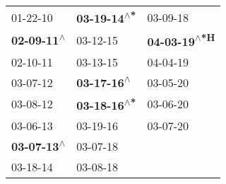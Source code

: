 \begin{supertabular}{lll}
                  01-22-10\textsuperscript{} &  \textbf{03-19-14\textsuperscript{$\wedge$*}} &                     03-09-18\textsuperscript{} \\
 \textbf{02-09-11\textsuperscript{$\wedge$}} &                    03-12-15\textsuperscript{} &  \textbf{04-03-19\textsuperscript{$\wedge$*H}} \\
                  02-10-11\textsuperscript{} &                    03-13-15\textsuperscript{} &                     04-04-19\textsuperscript{} \\
                  03-07-12\textsuperscript{} &   \textbf{03-17-16\textsuperscript{$\wedge$}} &                     03-05-20\textsuperscript{} \\
                  03-08-12\textsuperscript{} &  \textbf{03-18-16\textsuperscript{$\wedge$*}} &                     03-06-20\textsuperscript{} \\
                  03-06-13\textsuperscript{} &                    03-19-16\textsuperscript{} &                     03-07-20\textsuperscript{} \\
 \textbf{03-07-13\textsuperscript{$\wedge$}} &                    03-07-18\textsuperscript{} &                                                \\
                  03-18-14\textsuperscript{} &                    03-08-18\textsuperscript{} &                                                \\
\end{supertabular}
